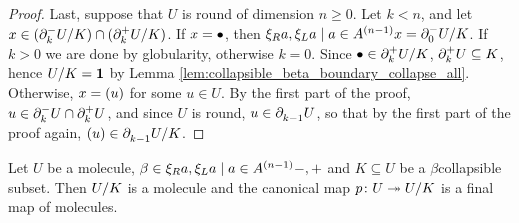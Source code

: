 \begin{proof}
    Last, suppose that \( U \) is round of dimension \( n \geq 0 \).
    Let \( k < n \), and let \( x \in (\bd{k}{-} \coll{K}{U}) \cap (\bd{k}{+} \coll{K}{U}) \).
    If \( x = \zcoll \), then \( \set{x} = \bd{0}{-} \coll{K}{U} \).
    If \( k > 0 \) we are done by globularity, otherwise \( k = 0 \).
    Since \( \zcoll \in \bd{k}{+} \coll{K}{U} \), \( \bd{k}{+} U \subseteq K \), hence \( \coll{K}{U} = \pt \) by Lemma \ref{lem:collapsible_beta_boundary_collapse_all}.
    Otherwise, \( x = \icoll{u} \) for some \( u \in U \).
    By the first part of the proof, \( u \in \bd{k}{-} U \cap \bd{k}{+} U \), and since \( U \) is round, \( u \in \bd{k - 1}{} U \), so that by the first part of the proof again, \( \icoll{u} \in \bd{k - 1}{} \coll{K}{U} \).
\end{proof}

\begin{prop} \label{prop:collapsible_collapse_to_molecules}
    Let \( U \) be a molecule, \( \beta \in \set{-, +} \) and \( K \subseteq U \) be a \( \beta \)\nbd collapsible subset.
    Then \( \coll{K}{U} \) is a molecule and the canonical map \( \mapcoll \colon U \surj \coll{K}{U} \) is a final map of molecules.
\end{prop}
